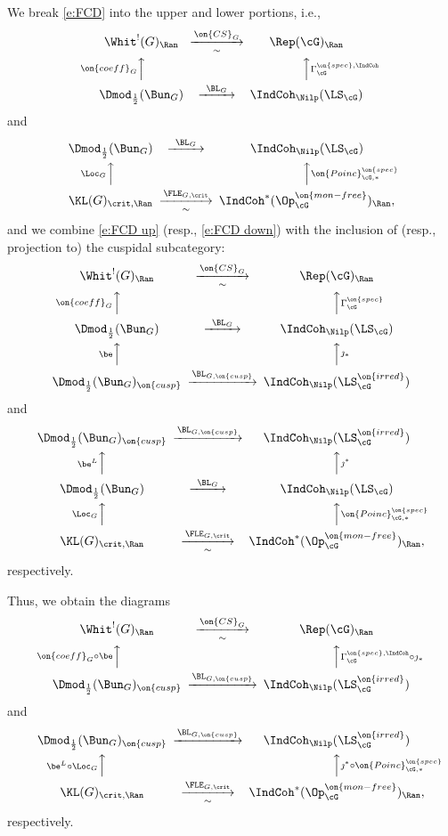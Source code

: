 \documentclass[9pt]{amsart}
\theoremstyle{remark}
\theoremstyle{definition}
\theoremstyle{remark}
\numberwithin{equation}{section}
\begin{document}
We break \eqref{e:FCD} into the upper and lower portions, i.e.,
\begin{equation} \label{e:FCD up}
\CD
\Whit^!(G)_\Ran @>{\on{CS}_G}>{\sim}>  \Rep(\cG)_\Ran \\
@A{\on{coeff}_G}AA @AA{\Gamma^{\on{spec},\IndCoh}_\cG}A \\
\Dmod_{\frac{1}{2}}(\Bun_G) @>{\BL_G}>>  \IndCoh_\Nilp(\LS_\cG) 
\endCD
\end{equation}
and
\begin{equation} \label{e:FCD down}
\CD
\Dmod_{\frac{1}{2}}(\Bun_G) @>{\BL_G}>>  \IndCoh_\Nilp(\LS_\cG) \\
@A{\Loc_G}AA @AA{\on{Poinc}^{\on{spec}}_{\cG,*}}A \\
\KL(G)_{\crit,\Ran} @>{\FLE_{G,\crit}}>{\sim}> \IndCoh^*(\Op^{\on{mon-free}}_\cG)_\Ran,
\endCD
\end{equation} 
and we combine \eqref{e:FCD up} (resp., \eqref{e:FCD down}) with the inclusion of (resp., projection to) the
cuspidal subcategory:
$$
\CD
\Whit^!(G)_\Ran @>{\on{CS}_G}>{\sim}>  \Rep(\cG)_\Ran \\
@A{\on{coeff}_G}AA @AA{\Gamma^{\on{spec}}_\cG}A \\
\Dmod_{\frac{1}{2}}(\Bun_G) @>{\BL_G}>>  \IndCoh_\Nilp(\LS_\cG) \\
@A{\be}AA @AA{\jmath_*}A \\
\Dmod_{\frac{1}{2}}(\Bun_G)_{\on{cusp}} @>{\BL_{G,\on{cusp}}}>>  \IndCoh_\Nilp(\LS^{\on{irred}}_\cG) 
\endCD
$$
and
$$
\CD
\Dmod_{\frac{1}{2}}(\Bun_G)_{\on{cusp}} @>{\BL_{G,\on{cusp}}}>>  \IndCoh_\Nilp(\LS^{\on{irred}}_\cG) \\
@A{\be^L}AA @AA{\jmath^*}A \\
\Dmod_{\frac{1}{2}}(\Bun_G) @>{\BL_G}>>  \IndCoh_\Nilp(\LS_\cG) \\
@A{\Loc_G}AA @AA{\on{Poinc}^{\on{spec}}_{\cG,*}}A \\
\KL(G)_{\crit,\Ran} @>{\FLE_{G,\crit}}>{\sim}> \IndCoh^*(\Op^{\on{mon-free}}_\cG)_\Ran,
\endCD
$$
respectively.

\sssec{}

Thus, we obtain the diagrams
\begin{equation} \label{e:FCD up cusp}
\CD
\Whit^!(G)_\Ran @>{\on{CS}_G}>{\sim}>  \Rep(\cG)_\Ran \\
@A{\on{coeff}_G\circ \be}AA @AA{\Gamma^{\on{spec},\IndCoh}_\cG\circ \jmath_*}A \\
\Dmod_{\frac{1}{2}}(\Bun_G)_{\on{cusp}}  @>{\BL_{G,\on{cusp}}}>>  \IndCoh_\Nilp(\LS^{\on{irred}}_\cG) 
\endCD
\end{equation}
and 
\begin{equation} \label{e:FCD down cusp}
\CD
\Dmod_{\frac{1}{2}}(\Bun_G)_{\on{cusp}}  @>{\BL_{G,\on{cusp}}}>>  \IndCoh_\Nilp(\LS^{\on{irred}}_\cG) \\
@A{\be^L\circ \Loc_G}AA @AA{\jmath^*\circ \on{Poinc}^{\on{spec}}_{\cG,*}}A \\
\KL(G)_{\crit,\Ran} @>{\FLE_{G,\crit}}>{\sim}> \IndCoh^*(\Op^{\on{mon-free}}_\cG)_\Ran,
\endCD
\end{equation} 
respectively. 
\end{document}
